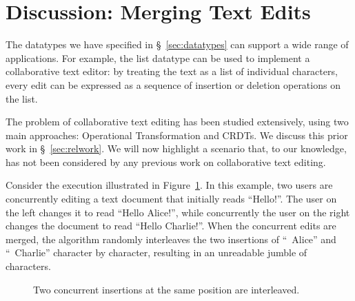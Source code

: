 \section{Discussion: Merging Text Edits}\label{sec:bad-merge}

The datatypes we have specified in \S~\ref{sec:datatypes} can support a wide range of applications.
For example, the list datatype can be used to implement a collaborative text editor: by treating the text as a list of individual characters, every edit can be expressed as a sequence of insertion or deletion operations on the list.

The problem of collaborative text editing has been studied extensively, using two main approaches: Operational Transformation and CRDTs.
We discuss this prior work in \S~\ref{sec:relwork}.
We will now highlight a scenario that, to our knowledge, has not been considered by any previous work on collaborative text editing.

Consider the execution illustrated in Figure~\ref{fig:bad-merge}.
In this example, two users are concurrently editing a text document that initially reads ``Hello!''.
The user on the left changes it to read ``Hello Alice!'', while concurrently the user on the right changes the document to read ``Hello Charlie!''.
When the concurrent edits are merged, the algorithm randomly interleaves the two insertions of ``~Alice'' and ``~Charlie'' character by character, resulting in an unreadable jumble of characters.

\begin{figure}
\centering
{}
\caption{Two concurrent insertions at the same position are interleaved.}\label{fig:bad-merge}
\end{figure}

